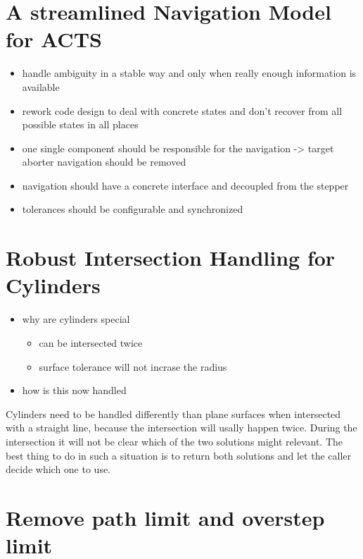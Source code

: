 \section{A streamlined Navigation Model for ACTS}

\begin{itemize}
    \color{red}
    \item handle ambiguity in a stable way and only when really enough information is available
    \item rework code design to deal with concrete states and don't recover from all possible states in all places
    \item one single component should be responsible for the navigation -> target aborter navigation should be removed
    \item navigation should have a concrete interface and decoupled from the stepper
    \item tolerances should be configurable and synchronized
\end{itemize}

\section{Robust Intersection Handling for Cylinders}

\begin{itemize}
    \color{red}
    \item why are cylinders special
    \begin{itemize}
        \item can be intersected twice
        \item surface tolerance will not incrase the radius
    \end{itemize}
    \item how is this now handled
\end{itemize}

Cylinders need to be handled differently than plane surfaces when intersected with a straight line, because the intersection will usally happen twice. During the intersection it will not be clear which of the two solutions might relevant. The best thing to do in such a situation is to return both solutions and let the caller decide which one to use. 

\section{Remove path limit and overstep limit}

